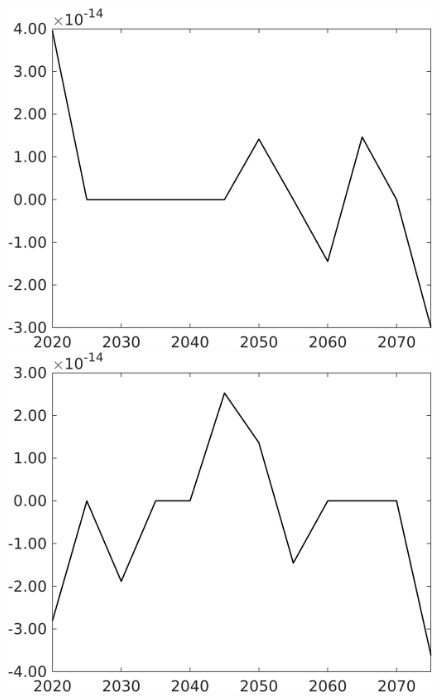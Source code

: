 \begin{figure}[h!!]
\begin{minipage}[]{0.32\textwidth}
\end{minipage}	
\begin{minipage}[]{0.32\textwidth}
\includegraphics[width=1\textwidth]{../../codding_model/own_basedOnFried/optimalPol_010922_revision/figures/all_13Sept22/CompTaul_Equlab_LFBAUPer_Reg0_pf_spillover0_nsk1_xgr1_knspil0_sep1_countec0_GovRev1_etaa0.79.png}
\end{minipage}
\begin{minipage}[]{0.32\textwidth}
\includegraphics[width=1\textwidth]{../../codding_model/own_basedOnFried/optimalPol_010922_revision/figures/all_13Sept22/CompTaul_Equlab_LFBAUPer_Reg0_pg_spillover0_nsk1_xgr1_knspil0_sep1_countec0_GovRev1_etaa0.79.png}
\end{minipage}
\end{figure}

